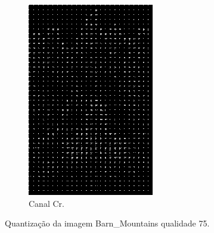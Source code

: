 \documentclass[a4paper, 12pt]{article}
\begin{document}
\begin{figure}[H]
\begin{subfigure}{0.3\textwidth}
                \includegraphics[scale=0.5]{resources/Quantization/CRQuantization75.png} 
                \caption{ Canal Cr.}
            \end{subfigure}
            \caption{\label{fig:my_label} Quantização da imagem Barn\_Mountains qualidade 75.}
        \end{figure}
        
        \vspace{0.5cm}
\end{document}

